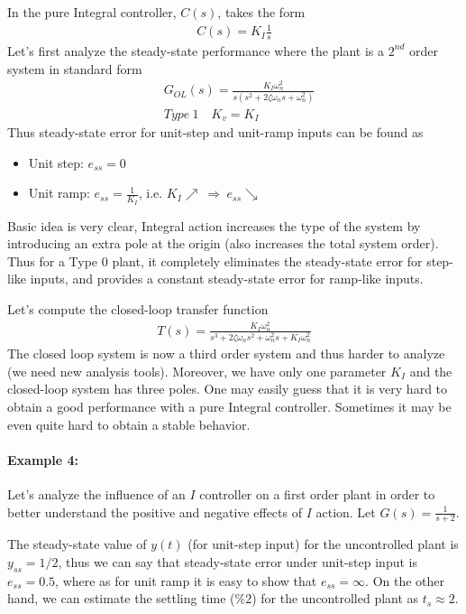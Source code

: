 \documentclass[twoside]{article}
\begin{document}
In the pure Integral controller, $C(s)$, takes the form
%
\begin{align*}
 C(s) = K_I \frac{1}{s}
\end{align*}
%
Let's first analyze the steady-state 
performance where the plant is a $2^{nd}$ order system in standard form
%
\begin{align*}
  &G_{OL}(s) = \frac{K_I \omega_n^2}{s (s^2 + 2 \zeta
    \omega_n s + \omega_n^2)}
\\
 &Type \ 1 \quad K_v = K_I
\end{align*}
% 
Thus steady-state error for unit-step and unit-ramp inputs can be found
as
\begin{itemize}
\item Unit step: $e_{ss} = 0$ 
\item Unit ramp: $e_{ss} = \frac{1}{K_I}$, i.e. $K_I \nearrow \ \Rightarrow \ e_{ss} \searrow$  
\end{itemize}
Basic idea is very clear, Integral action increases the type of the
system by introducing an extra pole at the origin (also increases the
total system order). Thus for a Type 0 plant, it completely eliminates 
the steady-state error for step-like inputs, and provides a
constant steady-state error for ramp-like inputs. 

Let's compute the closed-loop transfer function
%
\begin{align*}
T(s) = \frac{K_I \omega_n^2}{s^3 + 2 \zeta \omega_n s^2 + \omega_n^2 s
  + K_I \omega_n^2}
\end{align*}
The closed loop system is now a third order system and
thus harder to analyze (we need new analysis tools). Moreover, 
we have only one parameter $K_I$ and the closed-loop system has
three poles. One may easily guess that it is very hard to obtain 
a good performance with a pure Integral controller. 
Sometimes it may be even quite hard to obtain a stable behavior.

\paragraph{Example 4:} Let's analyze the influence of an $I$ controller on a
first order plant in order to better understand the positive and
negative effects of $I$ action. Let $G(s) = \frac{1}{s+2}$.

The steady-state value of $y(t)$ (for unit-step input)
for the uncontrolled plant is $y_{ss} = 1/2$, thus we 
can say that steady-state error under unit-step input is 
$e_{ss} = 0.5$, where as for unit ramp it is easy to
show that $e_{ss} = \infty$. On the other hand, we can estimate the
settling time ($\%2$) for the uncontrolled plant as $t_{s} \approx 2.$
\end{document}

